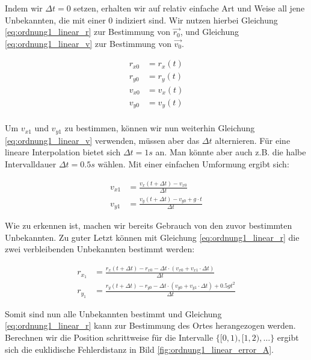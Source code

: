 Indem wir $\Delta t = 0$ setzen, erhalten wir auf relativ einfache Art und Weise all jene Unbekannten, die mit einer $0$ indiziert sind.
Wir nutzen hierbei Gleichung \eqref{eq:ordnung1_linear_r} zur Bestimmung von $\vec{r_0}$, und Gleichung \eqref{eq:ordnung1_linear_v} zur Bestimmung von $\vec{v_0}$.

\begin{equation}
\label{eq:ordnung1_linear_solutionPart1}
\begin{aligned}
r_{x0} &= r_x(t) \\
r_{y0} &= r_y(t) \\
v_{x0} &= v_x(t) \\
v_{y0} &= v_y(t) \\
\end{aligned}
\end{equation}

Um $v_{x1}$ und $v_{y1}$ zu bestimmen, können wir nun weiterhin Gleichung \ref{eq:ordnung1_linear_v} verwenden, müssen aber das $\Delta t$ alternieren.
Für eine lineare Interpolation bietet sich $\Delta t = 1s$ an.
Man könnte aber auch z.B. die halbe Intervalldauer $\Delta t = 0.5s$ wählen.
Mit einer einfachen Umformung ergibt sich:

\begin{equation}
\label{eq:ordnung1_linear_solutionPart2}
\begin{aligned}
v_{x1} &=  \frac{v_x(t + \Delta t) - v_{x0}}{\Delta t} \\
v_{y1} &=  \frac{v_y(t + \Delta t) - v_{y0} + g \cdot t}{\Delta t}
\end{aligned}
\end{equation}

Wie zu erkennen ist, machen wir bereits Gebrauch von den zuvor bestimmten Unbekannten.
Zu guter Letzt können mit Gleichung \ref{eq:ordnung1_linear_r} die zwei verbleibenden Unbekannten bestimmt werden:

\begin{equation}
\label{eq:ordnung1_linear_solutionPart3}
\begin{aligned}
r_{x_1} &= \frac{r_x(t + \Delta t) - r_{x0} - \Delta t \cdot(v_{x0} + v_{x1}  \cdot \Delta t)}{\Delta t} \\
r_{y_1} &= \frac{r_y(t + \Delta t) - r_{y0} - \Delta t \cdot(v_{y0} + v_{y1}  \cdot \Delta t) + 0.5gt^2}{\Delta t}
\end{aligned}
\end{equation}


Somit sind nun alle Unbekannten bestimmt und Gleichung \eqref{eq:ordnung1_linear_r} kann zur Bestimmung des Ortes herangezogen werden.
Berechnen wir die Position schrittweise für die Intervalle $\{[0,1), [1, 2), \dots\}$ ergibt sich die euklidische Fehlerdistanz in Bild \ref{fig:ordnung1_linear_error_A}.

